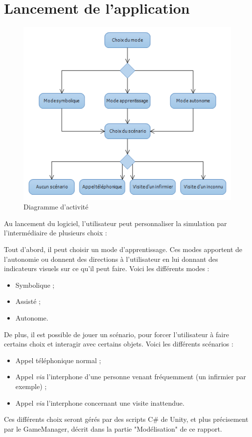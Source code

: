 \section{Lancement de l'application}

\begin{figure}[h]
\centering
\includegraphics[width=1\textwidth]{4-conception/img/diagActivite.png}
\caption{ Diagramme d'activité}
\end{figure}

Au lancement du logiciel, l'utilisateur peut personnaliser la simulation par l'intermédiaire de plusieurs choix :

Tout d'abord, il peut choisir un mode d'apprentissage. Ces modes apportent de l'autonomie ou donnent des directions à l'utilisateur en lui donnant des indicateurs visuels sur ce qu'il peut faire. Voici les différents modes :
\begin{itemize}
\item Symbolique ;
\item Assisté ;
\item Autonome.
\end{itemize}


De plus, il est possible de jouer un scénario, pour forcer l'utilisateur à faire certains choix et interagir avec certains objets. Voici les différents scénarios :
\begin{itemize}
\item Appel téléphonique normal ;
\item Appel \textit{via} l'interphone d'une personne venant fréquemment (un infirmier par exemple) ;
\item Appel \textit{via} l'interphone concernant une visite inattendue.
\end{itemize}


Ces différents choix seront gérés par des scripts C\# de Unity, et plus précisement par le GameManager, décrit dans la partie "Modélisation" de ce rapport.

